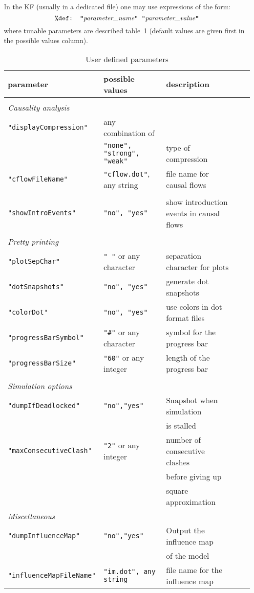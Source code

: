 \documentclass[11pt]{book}
\def\ttt#1{\texttt{#1}}
\begin{document}
In the KF (usually in a dedicated file) one may use expressions of the form:
\[
\hbox{\ttt{\%def: "}\textit{parameter\_name}\ttt{" "}\textit{parameter\_value}\ttt{"}}
\]
where tunable parameters are described table~\ref{tab:parameters} (default values are given first in the possible values column).
\begin{table}[ht]
\caption{User defined parameters}
\begin{tabular}{l|l|lll}
parameter & possible values & description \\
\hline &\\
\textit{Causality analysis}&\\
\ttt{"displayCompression"} & any combination of \\
&  \ttt{"none", "strong", "weak"} & \small type of compression \\
\ttt{"cflowFileName"} & \ttt{"cflow.dot"}, any string & \small file name for causal flows\\ & \\
\ttt{"showIntroEvents"} & \ttt{"no", "yes"} & \small show introduction events in causal flows\\ & \\
\textit{Pretty printing}&\\
\ttt{"plotSepChar"} & \ttt{" "} or any character & \small separation character for plots\\
\ttt{"dotSnapshots"} & \ttt{"no", "yes"} & \small generate dot snapshots\\
\ttt{"colorDot"} &  \ttt{"no", "yes"} & \small use colors in dot format files\\
\ttt{"progressBarSymbol"} & \ttt{"\#"} or any character & \small symbol for the progress bar\\
\ttt{"progressBarSize"} & \ttt{"60"} or any integer & \small length of the progress bar\\ &&\\
\textit{Simulation options} &\\
\ttt{"dumpIfDeadlocked"} & \ttt{"no","yes"} & \small Snapshot when simulation \\&&\small is stalled\\
\ttt{"maxConsecutiveClash"} & \ttt{"2"} or any integer & \small number of consecutive clashes \\ && \small before giving up \\ && \small square approximation\\
\textit{Miscellaneous} &\\
\ttt{"dumpInfluenceMap"} & \ttt{"no","yes"} & \small Output the influence map \\ &&\small of the model\\
\ttt{"influenceMapFileName"} & \ttt{"im.dot", any string} & \small file name for the influence map\\

\end{tabular}
\label{tab:parameters}
\end{table}
\end{document}
